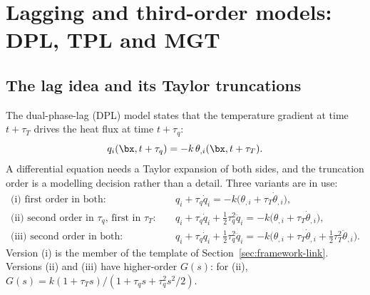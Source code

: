 \section{Lagging and third-order models: DPL, TPL and MGT}\label{sec:lags}
\subsection{The lag idea and its Taylor truncations}
The dual-phase-lag (DPL) model \citep{Tzou1995,Tzou1997} states that the temperature gradient at time $t+\tau_T$ drives the heat flux at time $t+\tau_q$:
\begin{equation}
q_i(\bx,t+\tau_q)=-k\,\theta_{,i}(\bx,t+\tau_T).\label{eq:lag}
\end{equation}
A differential equation needs a Taylor expansion of both sides, and the truncation order is a modelling decision rather than a detail. Three variants are in use:
\begin{align}
\text{(i) first order in both:}\quad & q_i+\tau_q\dot q_i=-k\bigl(\theta_{,i}+\tau_T\dot\theta_{,i}\bigr),\label{eq:dpl1}\\
\text{(ii) second order in }\tau_q\text{, first in }\tau_T:\quad & q_i+\tau_q\dot q_i+\tfrac12\tau_q^2\ddot q_i=-k\bigl(\theta_{,i}+\tau_T\dot\theta_{,i}\bigr),\label{eq:dpl2}\\
\text{(iii) second order in both:}\quad & q_i+\tau_q\dot q_i+\tfrac12\tau_q^2\ddot q_i=-k\bigl(\theta_{,i}+\tau_T\dot\theta_{,i}+\tfrac12\tau_T^2\ddot\theta_{,i}\bigr).\label{eq:dpl3}
\end{align}
Version (i) is the member of the template of Section~\ref{sec:framework-link}. Versions (ii) and (iii) have higher-order $G(s)$: for (ii), $G(s)=k(1+\tau_Ts)/(1+\tau_qs+\tau_q^2s^2/2)$.

